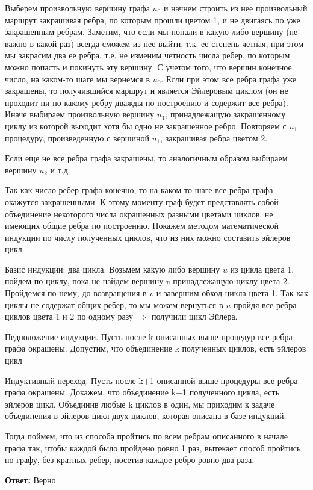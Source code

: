 \documentclass{article}
\begin{document}
Выберем произвольную вершину графа $u_0$ и начнем строить из нее произвольный маршрут закрашивая ребра, по которым прошли цветом 1, и не двигаясь по уже закрашенным ребрам.
Заметим, что если мы попали в какую-либо вершину (не важно в какой раз) всегда сможем из нее выйти, т.к. ее степень четная, при этом мы закрасим два ее ребра, т.е. не изменим четность числа ребер, по которым можно попасть и покинуть эту вершину. С учетом того, что вершин конечное число,  на каком-то шаге мы вернемся в $u_0$. Если при этом все ребра графа уже закрашены, то получившийся маршрут и является Эйлеровым циклом (он не проходит ни по какому ребру дважды по построению и содержит все ребра). Иначе выбираем произвольную вершину $u_1$, принадлежащую закрашенному циклу из которой выходит хотя бы одно не закрашенное ребро. Повторяем с $u_1$  процедуру, произведенную с вершиной $u_1$, закрашивая ребра цветом 2.

Если еще не все ребра графа закрашены, то аналогичным образом выбираем вершину $u_2$ и т.д.

Так как число ребер графа конечно, то на каком-то шаге все ребра графа окажутся закрашенными. К этому моменту граф будет представлять собой объединение некоторого числа окрашенных разными цветами циклов, не имеющих общие ребра по построению.
Покажем методом математической индукции по числу полученных  циклов, что из них можно составить эйлеров цикл.

Базис индукции: два цикла.
Возьмем какую либо вершину $u$ из цикла цвета 1, пойдем по циклу, пока не найдем вершину $v$ принадлежащую циклу цвета 2. Пройдемся по нему, до возвращения в $v$ и завершим обход цикла цвета 1. Так как циклы не содержат общих ребер, то мы можем вернуться в $u$ пройдя все ребра циклов цвета 1 и 2 по одному разу $\Rightarrow$ получили цикл Эйлера. 

Педположение индукции.
Пусть после k описанных выше процедур все ребра графа окрашены.
Допустим, что  объединение k полученных  циклов, есть эйлеров цикл

Индуктивный переход.
Пусть после k+1 описанной выше процедуры все ребра графа окрашены. Докажем, что объединение k+1 полученного цикла, есть эйлеров цикл. Объединив любые k циклов в один, мы приходим к задаче объединения в эйлеров цикл двух циклов, которая описана в базе индукций.

Тогда поймем, что из способа пройтись по всем ребрам описанного в начале графа так, чтобы каждой было пройдено 
ровно 1 раз, вытекает способ пройтись по графу, без кратных ребер, посетив каждое ребро ровно два раза.

\textbf{Ответ:} Верно.
\end{document}
